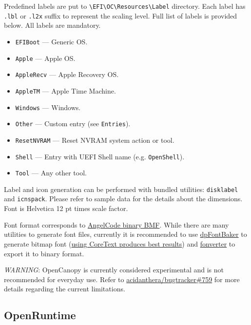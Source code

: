 \documentclass[]{article}
\providecommand{\tightlist}{%
  \setlength{\itemsep}{0pt}\setlength{\parskip}{0pt}}
\begin{document}
Predefined labels are put to \texttt{\textbackslash EFI\textbackslash OC\textbackslash Resources\textbackslash Label}
directory. Each label has \texttt{.lbl} or \texttt{.l2x} suffix to represent the scaling level.
Full list of labels is provided below. All labels are mandatory.

\begin{itemize}
\tightlist
  \item \texttt{EFIBoot} --- Generic OS.
  \item \texttt{Apple} --- Apple OS.
  \item \texttt{AppleRecv} --- Apple Recovery OS.
  \item \texttt{AppleTM} --- Apple Time Machine.
  \item \texttt{Windows} --- Windows.
  \item \texttt{Other} --- Custom entry (see \texttt{Entries}).
  \item \texttt{ResetNVRAM} --- Reset NVRAM system action or tool.
  \item \texttt{Shell} --- Entry with UEFI Shell name (e.g. \texttt{OpenShell}).
  \item \texttt{Tool} --- Any other tool.
\end{itemize}

Label and icon generation can be performed with bundled utilities: \texttt{disklabel} and
\texttt{icnspack}. Please refer to sample data for the details about the dimensions.
Font is Helvetica 12 pt times scale factor.

Font format corresponds to \href{https://www.angelcode.com/products/bmfont}{AngelCode binary BMF}.
While there are many utilities to generate font files, currently it is recommended to use
\href{https://github.com/danpla/dpfontbaker}{dpFontBaker} to generate bitmap font
(\href{https://github.com/danpla/dpfontbaker/pull/1}{using CoreText produces best results})
and \href{https://github.com/usr-sse2/fonverter}{fonverter} to export it to binary format.

\emph{WARNING}: OpenCanopy is currently considered experimental and is not recommended for
everyday use. Refer to
\href{https://github.com/acidanthera/bugtracker/issues/759}{acidanthera/bugtracker\#759}
for more details regarding the current limitations.

\subsection{OpenRuntime}\label{uefiruntime}
\end{document}

